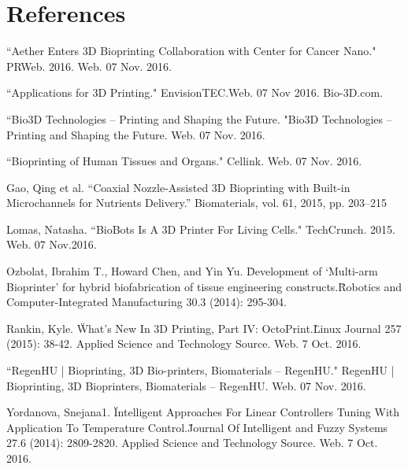 \chapter{References}

\begin{hangparas}{1cm}{1}
``Aether Enters 3D Bioprinting Collaboration with Center for Cancer Nano." PRWeb. 2016. Web. 07 Nov. 2016.

``Applications for 3D Printing." EnvisionTEC.Web. 07 Nov 2016.
Bio-3D.com. 

``Bio3D Technologies – Printing and Shaping the Future. "Bio3D Technologies – Printing and Shaping the Future. Web. 07 Nov. 2016.

``Bioprinting of Human Tissues and Organs." Cellink. Web. 07 Nov. 2016.

Gao, Qing et al. “Coaxial Nozzle-Assisted 3D Bioprinting with Built-in Microchannels for Nutrients Delivery.” Biomaterials, vol. 61, 2015, pp. 203–215

Lomas, Natasha. ``BioBots Is A 3D Printer For Living Cells." TechCrunch. 2015. Web. 07 Nov.2016. 

Ozbolat, Ibrahim T., Howard Chen, and Yin Yu. \"Development of ‘Multi-arm Bioprinter’ for hybrid biofabrication of tissue engineering constructs.\" Robotics and Computer-Integrated Manufacturing 30.3 (2014): 295-304.

Rankin, Kyle. \"What's New In 3D Printing, Part IV: OctoPrint.\" Linux Journal 257 (2015): 38-42. Applied Science and Technology Source. Web. 7 Oct. 2016.

``RegenHU | Bioprinting, 3D Bio-printers, Biomaterials – RegenHU." RegenHU | Bioprinting, 3D Bioprinters, Biomaterials – RegenHU. Web. 07 Nov. 2016.

Yordanova, Snejana1. \"Intelligent Approaches For Linear Controllers Tuning With Application To Temperature Control.\" Journal Of Intelligent and Fuzzy Systems 27.6 (2014): 2809-2820. Applied Science and Technology Source. Web. 7 Oct. 2016.

\end{hangparas}